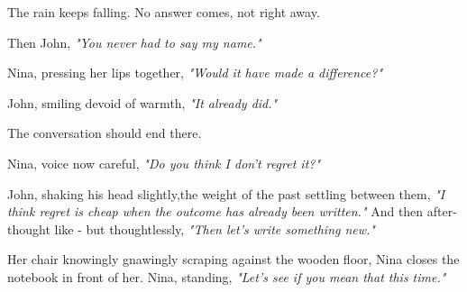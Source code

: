 \smallskip

The rain keeps falling. No answer comes, not right away.  

\smallskip

Then John, \textit{"You never had to say my name."}  

\smallskip

Nina, pressing her lips together, \textit{"Would it have made a difference?"}  
\smallskip

John, smiling devoid of warmth, \textit{"It already did."}  

\smallskip

The conversation should end there.  

\smallskip

Nina, voice now careful, \textit{"Do you think I don’t regret it?"}  

\smallskip

\noindent
John, shaking his head slightly,the weight of the past settling between them, \textit{"I think regret is cheap when the outcome has already been written."} And then after-thought like - but thoughtlessly, \textit{"Then let’s write something new."}  

\smallskip

\noindent
Her chair knowingly gnawingly scraping against the wooden floor, Nina closes the notebook in front of her.  Nina, standing, \textit{"Let’s see if you mean that this time."}  

\newpage
